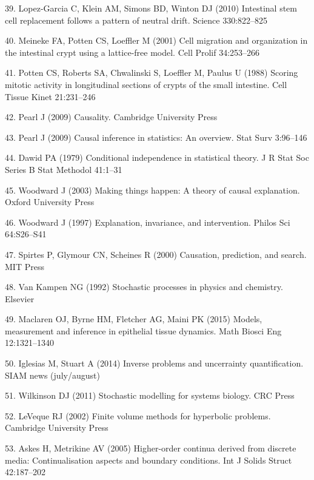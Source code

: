 \documentclass[10pt,letterpaper]{article}
\begin{document}
\hypertarget{ref-Lopez-Garcia2010-bv}{}
39. Lopez-Garcia C, Klein AM, Simons BD, Winton DJ (2010) Intestinal
stem cell replacement follows a pattern of neutral drift. Science
330:822--825

\hypertarget{ref-Meineke2001-na}{}
40. Meineke FA, Potten CS, Loeffler M (2001) Cell migration and
organization in the intestinal crypt using a lattice-free model. Cell
Prolif 34:253--266

\hypertarget{ref-Potten1988-tq}{}
41. Potten CS, Roberts SA, Chwalinski S, Loeffler M, Paulus U (1988)
Scoring mitotic activity in longitudinal sections of crypts of the small
intestine. Cell Tissue Kinet 21:231--246

\hypertarget{ref-Pearl2009-qh}{}
42. Pearl J (2009) Causality. Cambridge University Press

\hypertarget{ref-Pearl2009-jp}{}
43. Pearl J (2009) Causal inference in statistics: An overview. Stat
Surv 3:96--146

\hypertarget{ref-Dawid1979-gu}{}
44. Dawid PA (1979) Conditional independence in statistical theory. J R
Stat Soc Series B Stat Methodol 41:1--31

\hypertarget{ref-Woodward2003-oz}{}
45. Woodward J (2003) Making things happen: A theory of causal
explanation. Oxford University Press

\hypertarget{ref-Woodward1997-dk}{}
46. Woodward J (1997) Explanation, invariance, and intervention. Philos
Sci 64:S26--S41

\hypertarget{ref-Spirtes2000-zd}{}
47. Spirtes P, Glymour CN, Scheines R (2000) Causation, prediction, and
search. MIT Press

\hypertarget{ref-Van_Kampen1992-ik}{}
48. Van Kampen NG (1992) Stochastic processes in physics and chemistry.
Elsevier

\hypertarget{ref-Maclaren2015-be}{}
49. Maclaren OJ, Byrne HM, Fletcher AG, Maini PK (2015) Models,
measurement and inference in epithelial tissue dynamics. Math Biosci Eng
12:1321--1340

\hypertarget{ref-iglesias2014-uq}{}
50. Iglesias M, Stuart A (2014) Inverse problems and uncerrainty
quantification. SIAM news (july/august)

\hypertarget{ref-Wilkinson2011-wh}{}
51. Wilkinson DJ (2011) Stochastic modelling for systems biology. CRC
Press

\hypertarget{ref-LeVeque2002-eq}{}
52. LeVeque RJ (2002) Finite volume methods for hyperbolic problems.
Cambridge University Press

\hypertarget{ref-Askes2005-cd}{}
53. Askes H, Metrikine AV (2005) Higher-order continua derived from
discrete media: Continualisation aspects and boundary conditions. Int J
Solids Struct 42:187--202
\end{document}
